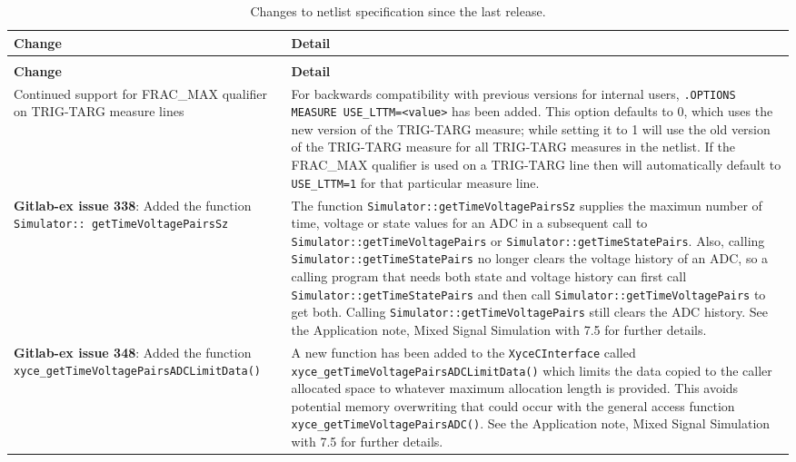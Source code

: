 {
\small

\begin{longtable}[h] {>{\raggedright\small}m{2in}|>{\raggedright\let\\\tabularnewline\small}m{3.5in}}
  \caption{Changes to netlist specification since the last release.\label{newUsage}} \\ \hline
  \rowcolor{XyceDarkBlue}
  \color{white}\textbf{Change} &
  \color{white}\textbf{Detail} \\ \hline \endfirsthead
  \caption[]{Changes to netlist specification since the last release.\label{newUsage}} \\ \hline
  \rowcolor{XyceDarkBlue}
  \color{white}\textbf{Change} &
  \color{white}\textbf{Detail} \\ \hline \endhead

Continued support for FRAC\_MAX qualifier on TRIG-TARG measure lines &
For backwards compatibility with previous \Xyce{} versions for internal
users, \texttt{.OPTIONS MEASURE USE\_LTTM=<value>} has been added.  This
option defaults to 0, which uses the new version of the TRIG-TARG measure;
while setting it to 1 will use the old version of the TRIG-TARG measure
for all TRIG-TARG measures in the netlist.  If the FRAC\_MAX qualifier is
used on a TRIG-TARG line then \Xyce{} will automatically default to
\texttt{USE\_LTTM=1} for that particular measure line.  \\ \hline

\textbf{Gitlab-ex issue 338}: Added the function \texttt{Simulator:: getTimeVoltagePairsSz} & The function
\texttt{Simulator::getTimeVoltagePairsSz} supplies the maximun 
number of time, voltage or state values for an ADC in a subsequent call to 
\texttt{Simulator::getTimeVoltagePairs} or \texttt{Simulator::getTimeStatePairs}.
Also, calling \texttt{Simulator::getTimeStatePairs} no longer clears the voltage
history of an ADC, so a calling program that needs both state and voltage history
can first call \texttt{Simulator::getTimeStatePairs} and then call 
\texttt{Simulator::getTimeVoltagePairs} to get both.  Calling 
\texttt{Simulator::getTimeVoltagePairs} still clears the ADC history.
See the Application note, Mixed Signal Simulation with \Xyce{} 7.5 for further 
details. \\ \hline

\textbf{Gitlab-ex issue 348}:  Added the function \texttt{xyce\_getTimeVoltagePairs\-ADCLimitData()}  &
  A new function has been added to the \texttt{XyceCInterface} called 
  \texttt{xyce\_getTimeVoltagePairsADCLimitData()} which limits the data copied 
  to the caller allocated space to whatever maximum 
  allocation length is provided.  This avoids potential memory overwriting that
  could occur with the general access function \texttt{xyce\_getTimeVoltagePairsADC()}.
  See the Application note, Mixed Signal Simulation with \Xyce{} 7.5 for further details.  \\ \hline

\end{longtable}
}
